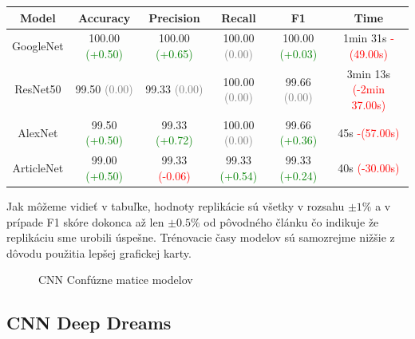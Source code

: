 \documentclass[journal,onecolumn]{IEEEtran}
\begin{document}
\begin{center}
{\renewcommand{\arraystretch}{1.5}
\begin{tabular}{|c|ccccc}
\hline
Model & Accuracy & Precision & Recall & F1 & Time \\                            
\hline          

GoogleNet & 
100.00 \textcolor{green}{(+0.50)} & 
100.00 \textcolor{green}{(+0.65)} & 
100.00 \textcolor{gray}{(0.00)} & 
100.00 \textcolor{green}{(+0.03)} & 
1min 31s \textcolor{red}{-(49.00s)} \\

ResNet50 & 
99.50 \textcolor{gray}{(0.00)} & 
99.33 \textcolor{gray}{(0.00)} & 
100.00 \textcolor{gray}{(0.00)} & 
99.66 \textcolor{gray}{(0.00)} & 
3min 13s \textcolor{red}{(-2min 37.00s)} \\

AlexNet & 
99.50 \textcolor{green}{(+0.50)} & 
99.33 \textcolor{green}{(+0.72)} & 
100.00 \textcolor{gray}{(0.00)} & 
99.66 \textcolor{green}{(+0.36)} & 
45s \textcolor{red}{-(57.00s)} \\

ArticleNet & 
99.00 \textcolor{green}{(+0.50)} & 
99.33 \textcolor{red}{(-0.06)} & 
99.33 \textcolor{green}{(+0.54)} & 
99.33 \textcolor{green}{(+0.24)} & 
40s \textcolor{red}{(-30.00s)}

\end{tabular}}
\end{center}

\vspace{10pt}
Jak môžeme vidieť v tabuľke, hodnoty replikácie sú všetky v rozsahu $\pm 1\%$ a v prípade F1 skóre dokonca až len $\pm 0.5\%$ od pôvodného článku čo indikuje že replikáciu sme urobili úspešne. Trénovacie časy modelov sú samozrejme nižšie z dôvodu použitia lepšej grafickej karty.

\begin{figure}[!htb]
    \centering
    \caption{CNN Confúzne matice modelov}
    \label{fig:foobar}
\end{figure}

\subsection{CNN Deep Dreams}
\end{document}

